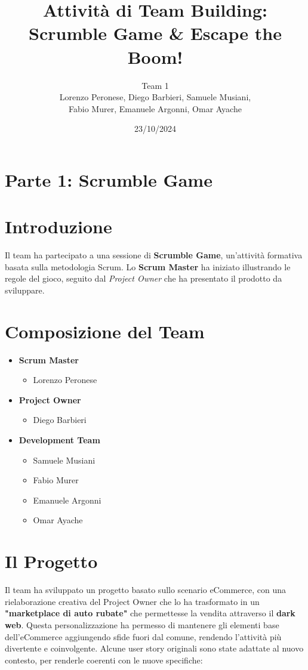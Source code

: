 \documentclass{article}
\title{\textbf{Attività di Team Building:\\Scrumble Game \& Escape the Boom!}}
\author{Team 1\\
Lorenzo Peronese, Diego Barbieri, Samuele Musiani,\\
Fabio Murer, Emanuele Argonni, Omar Ayache}
\date{23/10/2024}
\begin{document}
\maketitle

\section*{Parte 1: Scrumble Game}

\section*{Introduzione}
Il team ha partecipato a una sessione di \textbf{Scrumble Game}, un'attività formativa basata sulla metodologia Scrum. Lo \textbf{Scrum Master} ha iniziato illustrando le regole del gioco, seguito dal \textit{Project Owner} che ha presentato il prodotto da sviluppare.

\section*{Composizione del Team}
\begin{itemize}
    \item \textbf{Scrum Master}
    \begin{itemize}
        \item Lorenzo Peronese
    \end{itemize}
    \item \textbf{Project Owner}
    \begin{itemize}
        \item Diego Barbieri
    \end{itemize}
    \item \textbf{Development Team}
    \begin{itemize}
        \item Samuele Musiani
        \item Fabio Murer
        \item Emanuele Argonni
        \item Omar Ayache
    \end{itemize}
\end{itemize}

\section*{Il Progetto}
Il team ha sviluppato un progetto basato sullo scenario eCommerce, con una rielaborazione creativa del Project Owner che lo ha trasformato in un \textbf{"marketplace di auto rubate"} che permettesse la vendita attraverso il \textbf{dark web}. Questa personalizzazione ha permesso di mantenere gli elementi base dell'eCommerce aggiungendo sfide fuori dal comune, rendendo l'attività più divertente e coinvolgente. Alcune user story originali sono state adattate al nuovo contesto, per renderle coerenti con le nuove specifiche:
\end{document}
